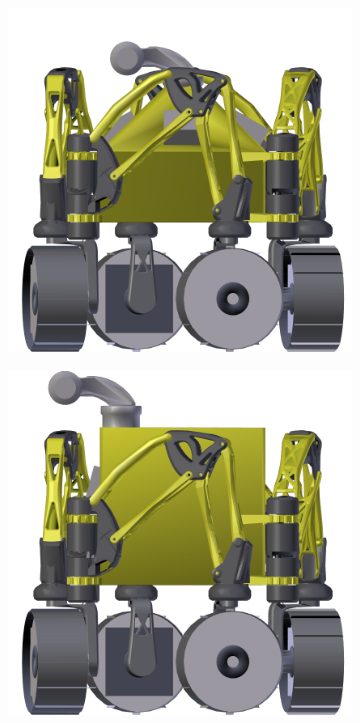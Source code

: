 \begin{figure}[h]
\captionsetup[subfigure]{justification=centering}
\vspace{-2ex}
	\centering
    \setlength{\subfigureWidth}{0.50\textwidth}
    \setlength{\graphicsHeight}{50mm}
    \hypersetup{hidelinks=true}%
    \begin{subfigure}[t]{\subfigureWidth}
        \centering
        \includegraphics[height=\graphicsHeight]{sections/design/solar-array/images/stowed-body-pyramid.png}
		\label{fig:sub:rover-body-redesign-stowed-before}
    \end{subfigure}\hfill
    \begin{subfigure}[t]{\subfigureWidth}
        \centering
        \includegraphics[height=\graphicsHeight]{sections/design/solar-array/images/stowed-body-box.png}

\end{subfigure}
\end{figure}
